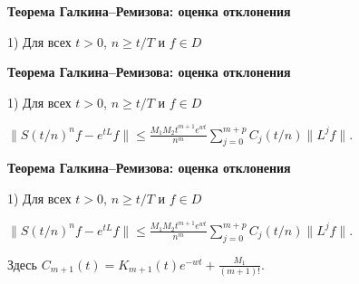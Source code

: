 \documentclass[11pt]{article}
\begin{document}
\newpage

\begin{center}
{\color{notaeYELLOW}\bfseries\fontsize{44}{52}\selectfont Теорема Галкина--Ремизова: оценка отклонения}
\end{center}
\vspace*{\fill}
\begin{center}
\fontsize{36}{43}\selectfont
\parbox{\linewidth}{\centering{} 1) Для всех $t>0$, $n\ge t/T$ и $f\in D$
\par}\vspace{0.4in}
\end{center}
\vspace*{\fill}

\newpage

\begin{center}
{\color{notaeYELLOW}\bfseries\fontsize{44}{52}\selectfont Теорема Галкина--Ремизова: оценка отклонения}
\end{center}
\vspace*{\fill}
\begin{center}
\fontsize{36}{43}\selectfont
\parbox{\linewidth}{\centering{} 1) Для всех $t>0$, $n\ge t/T$ и $f\in D$
\par}\vspace{0.4in}
\parbox{\linewidth}{\centering\noindent $\bigl\|S(t/n)^n f-e^{tL}f\bigr\|\le\frac{M_1M_2t^{m+1}e^{wt}}{n^m}\sum\limits_{j=0}^{m+p}C_j(t/n)\|L^jf\|.$
\par}\vspace{0.4in}
\end{center}
\vspace*{\fill}

\newpage

\begin{center}
{\color{notaeYELLOW}\bfseries\fontsize{44}{52}\selectfont Теорема Галкина--Ремизова: оценка отклонения}
\end{center}
\vspace*{\fill}
\begin{center}
\fontsize{36}{43}\selectfont
\parbox{\linewidth}{\centering{} 1) Для всех $t>0$, $n\ge t/T$ и $f\in D$
\par}\vspace{0.4in}
\parbox{\linewidth}{\centering\noindent $\bigl\|S(t/n)^n f-e^{tL}f\bigr\|\le\frac{M_1M_2t^{m+1}e^{wt}}{n^m}\sum\limits_{j=0}^{m+p}C_j(t/n)\|L^jf\|.$
\par}\vspace{0.4in}
\parbox{\linewidth}{\centering\noindent Здесь $C_{m+1}(t)=K_{m+1}(t)e^{-wt}+\frac{M_1}{(m+1)!}$.
\par}\vspace{0.4in}
\end{center}
\vspace*{\fill}
\end{document}
